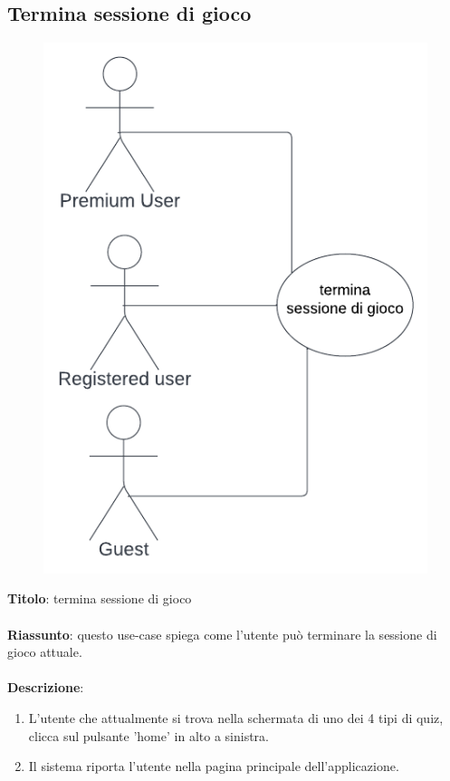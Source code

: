 \newpage
\subsection{Termina sessione di gioco} \label{req_termina_sessione_gioco}
\begin{figure}[!h]
\centering
\includegraphics[scale=0.35]{images/use_case_termina_sessione_di_gioco.png}
\end{figure}
\noindent
\textbf{Titolo}: termina sessione di gioco \\
\\
\textbf{Riassunto}: questo use-case spiega come l'utente può terminare la sessione di gioco attuale. \\
\\
\textbf{Descrizione}: 
\begin{enumerate}
    \item L'utente che attualmente si trova nella schermata di uno dei 4 tipi di quiz, clicca sul pulsante 'home' in alto a sinistra.
    \item Il sistema riporta l'utente nella pagina principale dell'applicazione.
\end{enumerate}

